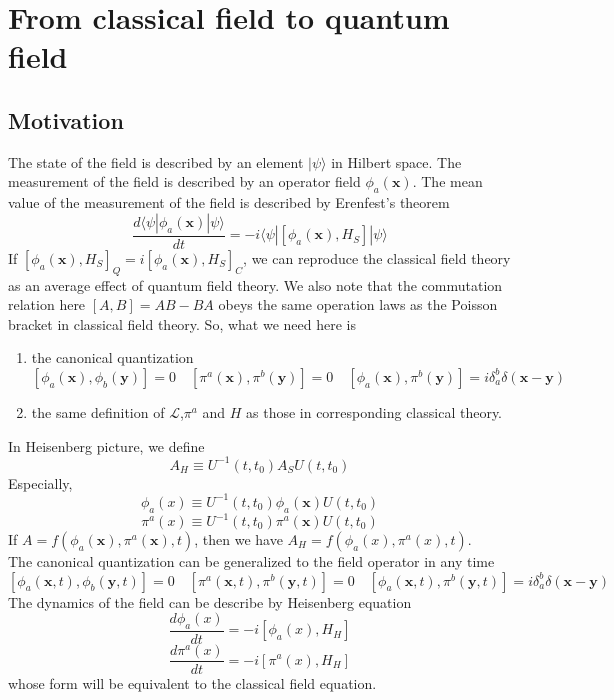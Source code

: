 \documentclass[cyan]{elegantnote}
\author{Yuyang Songsheng}
\begin{document}
\maketitle
\tableofcontents
\chapter{From classical field to quantum field}
\section{Motivation}
\noindent
The state of the field is described by an element $|\psi\rangle$ in Hilbert space. The measurement of the field is described by an operator field $\phi_a(\bm{x})$. The mean value of the measurement of the field is described by Erenfest's theorem
\[\frac{d\langle \psi| \phi_a(\bm{x}) | \psi \rangle}{dt} = -i \langle \psi | [\phi_a(\bm{x}),H_S] | \psi \rangle\]
If $[\phi_a(\bm{x}),H_S]_Q = i[\phi_a(\bm{x}),H_S]_C$, we can reproduce the classical field theory as an average effect of quantum field theory. We also note that the commutation relation here $[A,B] = AB - BA$ obeys the same operation laws as the Poisson bracket in classical field theory. So, what we need here is
\begin{enumerate}
\item the canonical quantization
\[[\phi_a(\bm{x}),\phi_b(\bm{y})] = 0 \quad [\pi^a(\bm{x}),\pi^b(\bm{y})] = 0 \quad [\phi_a(\bm{x}),\pi^b(\bm{y})] = i \delta_a^b \delta(\bm{x}-\bm{y}) \]
\item the same definition of $\mathcal{L}$,$\pi^a$ and $H$ as those in corresponding classical theory.
\end{enumerate}
In Heisenberg picture, we define
\[A_H \equiv U^{-1}(t,t_0) A_S U(t,t_0)\]
Especially,
\[\phi_a(x) \equiv U^{-1}(t,t_0) \phi_a(\bm{x}) U(t,t_0)\]
\[\pi^a(x) \equiv U^{-1}(t,t_0) \pi^a(\bm{x}) U(t,t_0)\]
If $A = f(\phi_a(\bm{x}),\pi^a(\bm{x}),t)$, then we have $A_H = f(\phi_a(x),\pi^a(x),t)$. \\
The canonical quantization can be generalized to the field operator in any time
\[[\phi_a(\bm{x},t),\phi_b(\bm{y},t)] = 0 \quad [\pi^a(\bm{x},t),\pi^b(\bm{y},t)] = 0 \quad [\phi_a(\bm{x},t),\pi^b(\bm{y},t)] = i \delta_a^b \delta(\bm{x}-\bm{y}) \]
The dynamics of the field can be describe by Heisenberg equation
\[\frac{d\phi_a(x)}{dt} = -i[\phi_a(x),H_H]\]
\[\frac{d\pi^a(x)}{dt} = -i[\pi^a(x),H_H]\]
whose form will be equivalent to the classical field equation.
\end{document}
